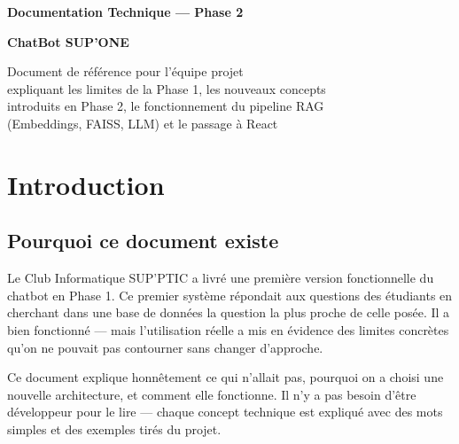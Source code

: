\documentclass[11pt,a4paper]{article}
\begin{document}
\begin{titlepage}
    \centering
    \vspace*{2cm}

    {\Huge \textbf{Documentation Technique — Phase 2}}

    \vspace{0.5cm}
    {\Large \textbf{ChatBot SUP'ONE}}

    \vspace{1.5cm}

    \begin{minipage}{0.8\textwidth}
        \centering
        \small Document de référence pour l'équipe projet \\
        expliquant les limites de la Phase 1, les nouveaux concepts \\
        introduits en Phase 2, le fonctionnement du pipeline RAG \\
        (Embeddings, FAISS, LLM) et le passage à React \\
    \end{minipage}

\end{titlepage}

\tableofcontents
\clearpage

\section{Introduction}

\subsection{Pourquoi ce document existe}

Le Club Informatique SUP'PTIC a livré une première version fonctionnelle
du chatbot en Phase 1. Ce premier système répondait aux questions des
étudiants en cherchant dans une base de données la question la plus
proche de celle posée. Il a bien fonctionné --- mais l'utilisation réelle
a mis en évidence des limites concrètes qu'on ne pouvait pas contourner
sans changer d'approche.

Ce document explique honnêtement ce qui n'allait pas, pourquoi on a
choisi une nouvelle architecture, et comment elle fonctionne. Il n'y a
pas besoin d'être développeur pour le lire --- chaque concept technique
est expliqué avec des mots simples et des exemples tirés du projet.
\end{document}
